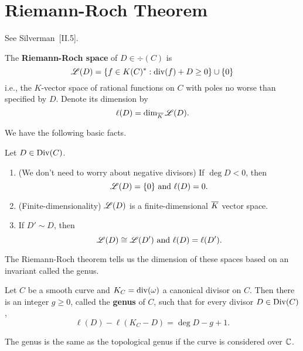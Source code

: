 \section{Riemann-Roch Theorem}
See Silverman~\cite{Si86}[II.5].
\begin{df}
The \textbf{Riemann-Roch space} of $D\in \div(C)$ is
\[
\mathscr{L}(D)=\left\{{f\in K(C)^*}:{\operatorname{div}(f)+D\ge 0}\right\}\cup \{0\}\]
i.e., the $K$-vector space of rational functions on $C$ with poles no worse than specified by $D$. Denote its dimension by
\[
\ell(D)=\dim_{\overline{K}} \mathscr{L}(D).
\]
\end{df}
We have the following basic facts.
\begin{pr}[Silverman~\cite{Si86}[II.5.2]
Let $D\in \operatorname{Div}(C)$.
\begin{enumerate}
\item (We don't need to worry about negative divisors) If $\deg D<0$, then 
\[
\mathscr{L}(D)=\{0\}\text{ and }\ell(D)=0.
\]
\item (Finite-dimensionality) $\mathscr{L}(D)$ is a finite-dimensional $\overline{K}$ vector space.
\item If $D'\sim D$, then 
\[
\mathscr{L}(D)\cong \mathscr{L}(D') \text{ and }\ell(D)=\ell(D').
\]

\end{enumerate}
\end{pr}


The Riemann-Roch theorem tells us the dimension of these spaces based on an invariant called the genus.

\begin{thm}
Let $C$ be a smooth curve and $K_C=\operatorname{div}(\omega)$ a canonical divisor on $C$. Then there is an integer $g\ge 0$, called the \textbf{genus} of $C$, such that for every divisor $D\in \operatorname{Div}(C)$,
\[
\ell(D)-\ell(K_C-D)=\deg D-g+1.
\]
\end{thm}
The genus is the same as the topological genus if the curve is considered over $\mathbb{C}$. 

